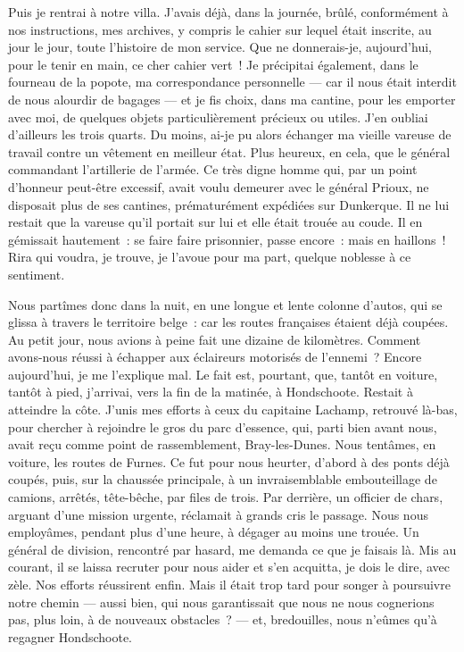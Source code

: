 \documentclass[french,twoside]{book} %
\begin{document}
Puis je rentrai à notre villa. J’avais déjà, dans la journée, brûlé, conformément à nos instructions, mes archives, y compris le cahier sur lequel était inscrite, au jour le jour, toute l’histoire de mon service. Que ne donnerais-je, aujourd’hui, pour le tenir en main, ce cher cahier vert ! Je précipitai également, dans le fourneau de la popote, ma correspondance personnelle — car il nous était interdit de nous alourdir de bagages — et je fis choix, dans ma cantine, pour les emporter avec moi, de quelques objets particulièrement précieux ou utiles. J’en oubliai d’ailleurs les trois quarts. Du moins, ai-je pu alors échanger ma vieille vareuse de travail contre un vêtement en meilleur état. Plus heureux, en cela, que le général commandant l’artillerie de l’armée. Ce très digne homme qui, par un point d’honneur peut-être excessif, avait voulu demeurer avec le général Prioux,   ne disposait plus de ses cantines, prématurément expédiées sur Dunkerque. Il ne lui restait que la vareuse qu’il portait sur lui et elle était trouée au coude. Il en gémissait hautement : se faire faire prisonnier, passe encore : mais en haillons ! Rira qui voudra, je trouve, je l’avoue pour ma part, quelque noblesse à ce sentiment.\par
Nous partîmes donc dans la nuit, en une longue et lente colonne d’autos, qui se glissa à travers le territoire belge : car les routes françaises étaient déjà coupées. Au petit jour, nous avions à peine fait une dizaine de kilomètres. Comment avons-nous réussi à échapper aux éclaireurs motorisés de l’ennemi ? Encore aujourd’hui, je me l’explique mal. Le fait est, pourtant, que, tantôt en voiture, tantôt à pied, j’arrivai, vers la fin de la matinée, à Hondschoote. Restait à atteindre la côte. J’unis mes efforts à ceux du capitaine Lachamp, retrouvé là-bas, pour chercher à rejoindre le gros du parc d’essence, qui, parti bien avant nous, avait reçu comme point de rassemblement, Bray-les-Dunes. Nous tentâmes, en voiture, les routes de Furnes. Ce fut pour nous heurter, d’abord à des ponts déjà coupés, puis, sur la chaussée principale, à un invraisemblable embouteillage de camions, arrêtés, tête-bêche, par files de trois. Par derrière, un officier de chars, arguant d’une mission urgente, réclamait à grands cris le passage. Nous nous employâmes, pendant plus d’une heure, à dégager au moins une trouée. Un général de division, rencontré par hasard, me demanda ce que je faisais là. Mis au courant, il se laissa recruter pour nous aider et s’en acquitta, je dois le dire, avec zèle. Nos efforts réussirent enfin. Mais il était trop tard pour songer à poursuivre notre chemin — aussi bien, qui nous garantissait que nous ne nous cognerions pas, plus loin, à de nouveaux obstacles ? — et, bredouilles, nous n’eûmes qu’à regagner Hondschoote.\par
\end{document}
